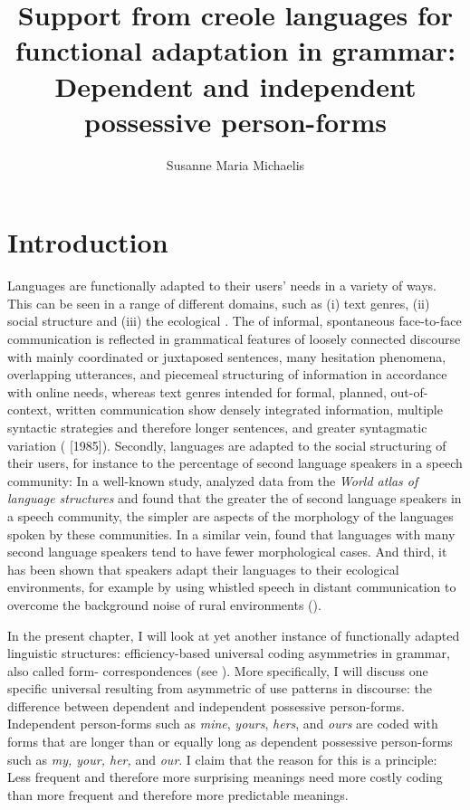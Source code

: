 \documentclass[output=paper]{langsci/langscibook}
\author{Susanne Maria Michaelis\affiliation{Leipzig University \& Max Planck Institute for the Science of Human History (Jena)}}
\title{Support from creole languages for functional adaptation in grammar: Dependent and independent possessive person-forms}
\begin{document}
\maketitle 




\section{Introduction}

Languages are functionally adapted to their users’ needs in a variety of ways. This can be seen in a range of different domains, such as (i) text genres, (ii) social structure and (iii) the ecological . The  of informal, spontaneous face-to-face communication is reflected in grammatical features of loosely connected discourse with mainly coordinated or juxtaposed sentences, many hesitation phenomena, overlapping utterances, and piecemeal structuring of information in accordance with online  needs, whereas text genres intended for formal, planned, out-of-context, written communication show densely integrated information, multiple syntactic  strategies and therefore longer sentences, and greater syntagmatic variation (\citealt{KochOesterreicher2012} [1985]). Secondly, languages are adapted to the social structuring of their users, for instance to the percentage of second language speakers in a speech community: In a well-known study, \citet{LupyanDale2010} analyzed data from the \textit{World atlas of language structures} \citep{HaspelmathEtAl2005} and found that the greater the  of second language speakers in a speech community, the simpler are aspects of the morphology of the languages spoken by these communities. In a similar vein, \citet{BentzWinter2013} found that languages with many second language speakers tend to have fewer morphological cases. And third, it has been shown that speakers adapt their languages to their ecological environments, for example by using whistled speech in distant communication to overcome the background noise of rural environments (\citealt{Meyer2005,Meyer2008}). 

In the present chapter, I will look at yet another instance of functionally adapted linguistic structures: efficiency-based universal coding asymmetries in grammar, also called form- correspondences (see ). More specifically, I will discuss one specific universal  resulting from asymmetric  of use patterns in discourse: the difference between dependent and independent possessive person-forms. Independent person-forms such as \textit{mine}, \textit{yours}, \textit{hers}, and \textit{ours} are coded with forms that are longer than or equally long as dependent possessive person-forms such as \textit{my, your, her,} and \textit{our}. I claim that the reason for this is a   principle: Less frequent and therefore more surprising meanings need more costly coding than more frequent and therefore more predictable meanings. 
\end{document}
